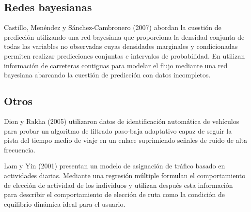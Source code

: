 \documentclass{llncs}
\begin{document}
\subsection{Redes bayesianas}
Castillo, Menéndez y Sánchez-Cambronero (2007) \cite{castillo2008predicting} abordan la cuestión de predicción utilizando una red bayesiana que proporciona la densidad conjunta de todas las variables no observadas cuyas densidades marginales y condicionadas permiten realizar predicciones conjuntas e intervalos de probabilidad.
En \cite{sun2006bayesian} utilizan información de carreteras contiguas para modelar el flujo mediante una red bayesiana abarcando la cuestión de predicción con datos incompletos.


\subsection{Otros}

Dion y Rakha (2005) \cite{dion2006estimating} utilizaron datos de identificación automática de vehículos para probar un algoritmo de filtrado paso-baja adaptativo capaz de seguir la pista del tiempo medio de viaje en un enlace suprimiendo señales de ruido de alta frecuencia.

Lam y Yin (2001) \cite{lam2001activity} presentan un modelo de asignación de tráfico basado en actividades diarias. Mediante una regresión múltiple formulan el comportamiento de elección de actividad de los individuos y utilizan después esta información para describir el comportamiento de elección de ruta como la condición de equilibrio dinámica ideal para el usuario.




\end{document}
